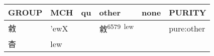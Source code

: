 \documentclass[14pt,a4paper]{scrartcl}
\begin{document}
\begin{longtable}[c]{@{}llllll@{}}
\toprule
\begin{minipage}[b]{0.14\columnwidth}\raggedright\strut
GROUP
\strut\end{minipage} &
\begin{minipage}[b]{0.14\columnwidth}\raggedright\strut
MCH
\strut\end{minipage} &
\begin{minipage}[b]{0.14\columnwidth}\raggedright\strut
qu
\strut\end{minipage} &
\begin{minipage}[b]{0.14\columnwidth}\raggedright\strut
other
\strut\end{minipage} &
\begin{minipage}[b]{0.14\columnwidth}\raggedright\strut
none
\strut\end{minipage} &
\begin{minipage}[b]{0.14\columnwidth}\raggedright\strut
PURITY
\strut\end{minipage}\tabularnewline
\midrule
\endhead
\begin{minipage}[t]{0.14\columnwidth}\raggedright\strut
敹
\strut\end{minipage} &
\begin{minipage}[t]{0.14\columnwidth}\raggedright\strut
'ewX
\strut\end{minipage} &
\begin{minipage}[t]{0.14\columnwidth}\raggedright\strut
\strut\end{minipage} &
\begin{minipage}[t]{0.14\columnwidth}\raggedright\strut
敹\textsuperscript{6579~lew}
\strut\end{minipage} &
\begin{minipage}[t]{0.14\columnwidth}\raggedright\strut
\strut\end{minipage} &
\begin{minipage}[t]{0.14\columnwidth}\raggedright\strut
pure:other
\strut\end{minipage}\tabularnewline
\begin{minipage}[t]{0.14\columnwidth}\raggedright\strut
杳
\strut\end{minipage} &
\begin{minipage}[t]{0.14\columnwidth}\raggedright\strut
lew
\strut\end{minipage} &
\begin{minipage}[t]{0.14\columnwidth}\raggedright\strut
\strut\end{minipage} &
\begin{minipage}[t]{0.14\columnwidth}\raggedright\strut

\end{minipage}
\end{longtable}
\end{document}
